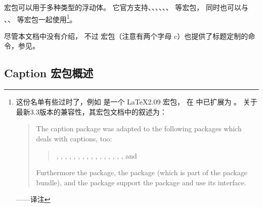  宏包可以用于多种类型的浮动体。
它官方支持、、、、、、 等宏包，
同时也可以与 、、 等宏包一起使用\footnote{
	这份名单有些过时了，例如  是一个 \LaTeX2.09 宏包，
	在 \LaTeXe{} 中已扩展为 。
	关于最新3.3版本的兼容性，其宏包文档\cite{caption-doc}中的叙述为：
	\begin{quotation}
		The caption package was adapted to the following packages which deals with captions, too:
		
		\begin{quote}
			, , , , , , , , , , , , , , , , and 
		\end{quote}
		
		Furthermore the  package, the  package (which is part of the  package bundle), and the  package support the  package and use its  interface.
	\end{quotation}
	——译注}。

尽管本文档中没有介绍，
不过  宏包（注意有两个字母 c）也提供了标题定制的命令，参见\cite{ccaption-doc}。

\subsection{Caption 宏包概述}\label{ssec:caption-overview}

